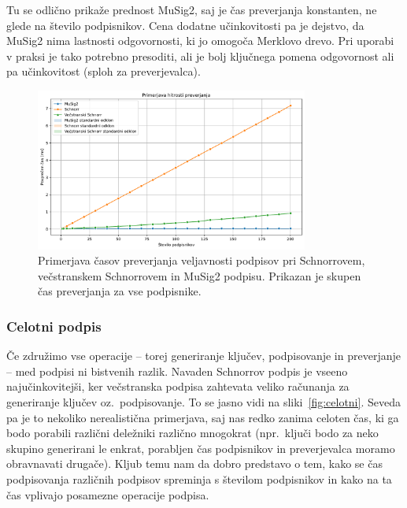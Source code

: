 Tu se odlično prikaže prednost MuSig2, saj je čas preverjanja konstanten, ne glede na število
podpisnikov. Cena dodatne učinkovitosti pa je dejstvo, da MuSig2 nima lastnosti odgovornosti, ki jo
omogoča Merklovo drevo. Pri uporabi v praksi je tako potrebno presoditi, ali je bolj ključnega pomena
odgovornost ali pa učinkovitost (sploh za preverjevalca).

\begin{figure}[ht]
  \centering
  \includegraphics[width=0.8\textwidth]{images/benchmark_Verification.pdf}
  \caption[Preverjanje.]{Primerjava časov preverjanja veljavnosti podpisov pri Schnorrovem, večstranskem
    Schnorrovem in MuSig2 podpisu. Prikazan je skupen čas preverjanja za vse podpisnike.}
  \label{fig:preverjanje}
\end{figure}

\subsubsection{Celotni podpis}
Če združimo vse operacije -- torej generiranje ključev, podpisovanje in preverjanje -- med podpisi
ni bistvenih razlik. Navaden Schnorrov podpis je vseeno najučinkovitejši, ker večstranska podpisa
zahtevata veliko računanja za generiranje ključev oz.\ podpisovanje. To se jasno vidi na
sliki~\ref{fig:celotni}. Seveda pa je to nekoliko nerealistična primerjava, saj nas redko zanima
celoten čas, ki ga bodo porabili različni deležniki različno mnogokrat (npr.\ ključi bodo za neko
skupino generirani le enkrat, porabljen čas podpisnikov in preverjevalca moramo obravnavati drugače).
Kljub temu nam da dobro predstavo o tem, kako se čas podpisovanja različnih podpisov spreminja s
številom podpisnikov in kako na ta čas vplivajo posamezne operacije podpisa.

